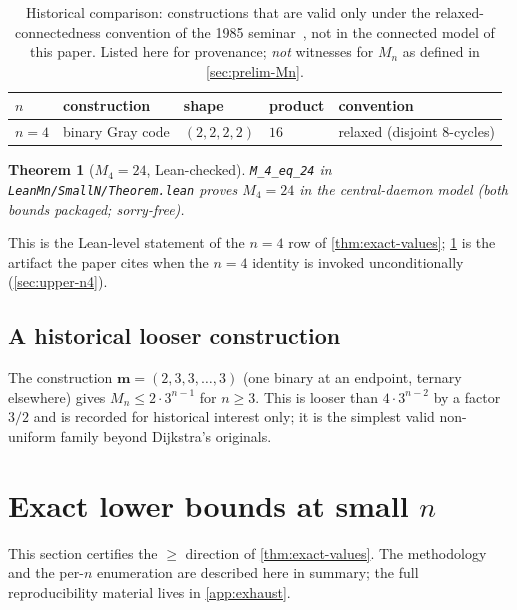 \documentclass[11pt,a4paper]{article}
\theoremstyle{plain}
\newtheorem{theorem}{Theorem}
\theoremstyle{definition}
\newcommand{\Mn}{M_n}
\begin{document}
\begin{table}[ht]
\centering
\small
\caption{Historical comparison: constructions that are valid only
under the relaxed-connectedness convention of the 1985
seminar~\cite{HaddadKnuth1985}, not in the connected model of this
paper.  Listed here for provenance; \emph{not} witnesses for
$\Mn$ as defined in \cref{sec:prelim-Mn}.}\label{tab:gray-historical}
\begin{tabular}{l l l l l}
\toprule
$n$ & construction & shape & product & convention\\\midrule
$n = 4$ & binary Gray code & $(2,2,2,2)$ & $16$ & relaxed (disjoint $8$-cycles)\\
\bottomrule
\end{tabular}
\end{table}

\begin{theorem}[$M_4 = 24$, Lean-checked]\label{thm:M4-eq-24}
\texttt{M\_4\_eq\_24} in \texttt{LeanMn/SmallN/Theorem.lean} proves
$M_4 = 24$ in the central-daemon model
(both bounds packaged; sorry-free).
\end{theorem}

This is the Lean-level statement of the $n = 4$ row of
\cref{thm:exact-values}; \cref{thm:M4-eq-24} is the artifact the
paper cites when the $n = 4$ identity is invoked unconditionally
(\cref{sec:upper-n4}).

\subsection{A historical looser construction}\label{sec:upper-sol3v1}

The construction $\mathbf{m} = (2, 3, 3, \ldots, 3)$ (one binary at an
endpoint, ternary elsewhere) gives $\Mn \le 2 \cdot 3^{n-1}$ for
$n \ge 3$.  This is looser than $4 \cdot 3^{n-2}$ by a factor $3/2$
and is recorded for historical interest only; it is the simplest valid
non-uniform family beyond Dijkstra's originals.

\section{Exact lower bounds at small $n$}\label{sec:lower}

This section certifies the $\ge$ direction of
\cref{thm:exact-values}.  The methodology
and the per-$n$ enumeration are described here in summary; the full
reproducibility material lives in \cref{app:exhaust}.
\end{document}
